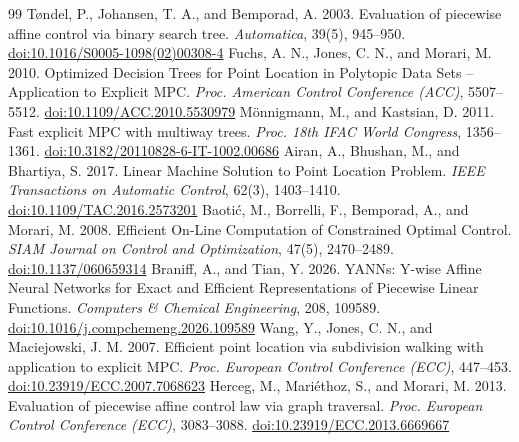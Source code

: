 \begin{thebibliography}{99}
 T{\o}ndel, P., Johansen, T. A., and Bemporad, A. 2003. Evaluation of piecewise affine control via binary search tree. \emph{Automatica}, 39(5), 945--950. \href{https://login.ezproxy.lib.purdue.edu/login?url=https://doi.org/10.1016/S0005-1098(02)00308-4}{doi:10.1016/S0005-1098(02)00308-4}
 Fuchs, A. N., Jones, C. N., and Morari, M. 2010. Optimized Decision Trees for Point Location in Polytopic Data Sets -- Application to Explicit {MPC}. \emph{Proc. American Control Conference (ACC)}, 5507--5512. \href{https://login.ezproxy.lib.purdue.edu/login?url=https://doi.org/10.1109/ACC.2010.5530979}{doi:10.1109/ACC.2010.5530979}
 M{\"o}nnigmann, M., and Kastsian, D. 2011. Fast explicit {MPC} with multiway trees. \emph{Proc. 18th IFAC World Congress}, 1356--1361. \href{https://login.ezproxy.lib.purdue.edu/login?url=https://doi.org/10.3182/20110828-6-IT-1002.00686}{doi:10.3182/20110828-6-IT-1002.00686}
 Airan, A., Bhushan, M., and Bhartiya, S. 2017. Linear Machine Solution to Point Location Problem. \emph{IEEE Transactions on Automatic Control}, 62(3), 1403--1410. \href{https://login.ezproxy.lib.purdue.edu/login?url=https://doi.org/10.1109/TAC.2016.2573201}{doi:10.1109/TAC.2016.2573201}
 Baoti{\'c}, M., Borrelli, F., Bemporad, A., and Morari, M. 2008. Efficient On-Line Computation of Constrained Optimal Control. \emph{SIAM Journal on Control and Optimization}, 47(5), 2470--2489. \href{https://login.ezproxy.lib.purdue.edu/login?url=https://doi.org/10.1137/060659314}{doi:10.1137/060659314}
 Braniff, A., and Tian, Y. 2026. {YANNs}: Y-wise Affine Neural Networks for Exact and Efficient Representations of Piecewise Linear Functions. \emph{Computers \& Chemical Engineering}, 208, 109589. \href{https://login.ezproxy.lib.purdue.edu/login?url=https://doi.org/10.1016/j.compchemeng.2026.109589}{doi:10.1016/j.compchemeng.2026.109589}
 Wang, Y., Jones, C. N., and Maciejowski, J. M. 2007. Efficient point location via subdivision walking with application to explicit {MPC}. \emph{Proc. European Control Conference (ECC)}, 447--453. \href{https://login.ezproxy.lib.purdue.edu/login?url=https://doi.org/10.23919/ECC.2007.7068623}{doi:10.23919/ECC.2007.7068623}
 Herceg, M., Mari{\'e}thoz, S., and Morari, M. 2013. Evaluation of piecewise affine control law via graph traversal. \emph{Proc. European Control Conference (ECC)}, 3083--3088. \href{https://login.ezproxy.lib.purdue.edu/login?url=https://doi.org/10.23919/ECC.2013.6669667}{doi:10.23919/ECC.2013.6669667}

\end{thebibliography}
